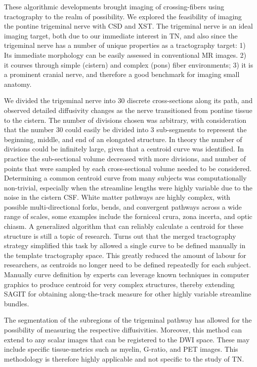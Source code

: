 These algorithmic developments brought imaging of crossing-fibers using tractography to the realm of possibility. We explored the feasibility of imaging the pontine trigeminal nerve with CSD and XST. The trigeminal nerve is an ideal imaging target, both due to our immediate interest in TN, and also since the trigeminal nerve has a number of unique properties as a tractography target: 1) Its immediate morphology can be easily assessed in conventional MR images. 2) it courses through simple (cistern) and complex (pons) fiber environments; 3) it is a prominent cranial nerve, and therefore a good benchmark for imaging small anatomy.

We divided the trigeminal nerve into 30 discrete cross-sections along its path, and observed detailed diffusivity changes as the nerve transitioned from pontine tissue to the cistern. The number of divisions chosen was arbitrary, with consideration that the number 30 could easily be divided into 3 sub-segments to represent the beginning, middle, and end of an elongated structure. In theory the number of divisions could be infinitely large, given that a centroid curve was identified. In practice the sub-sectional volume decreased with more divisions, and number of points that were sampled by each cross-sectional volume needed to be considered. Determining a common centroid curve from many subjects was computationally non-trivial, especially when the streamline lengths were highly variable due to the noise in the cistern CSF. White matter pathways are highly complex, with possible multi-directional forks, bends, and convergent pathways across a wide range of scales, some examples include the forniceal crura, zona incerta, and optic chiasm. A generalized algorithm that can reliably calculate a centroid for these structure is still a topic of research. 
Turns out that the merged tractography strategy simplified this task by allowed a single curve to be defined manually in the template tractography space. This greatly reduced the amount of labour for researchers, as centroids no longer need to be defined repeatedly for each subject. Manually curve definition by experts can leverage known techniques in computer graphics to produce centroid for very complex structures, thereby extending SAGIT for obtaining along-the-track measure for other highly variable streamline bundles.

The segmentation of the subregions of the trigeminal pathway has allowed for the possibility of measuring the respective diffusivities. Moreover, this method can extend to any scalar images that can be registered to the DWI space. These may include specific tissue-metrics such as myelin, G-ratio, and PET images. This methodology is therefore highly applicable and not specific to the study of TN.


